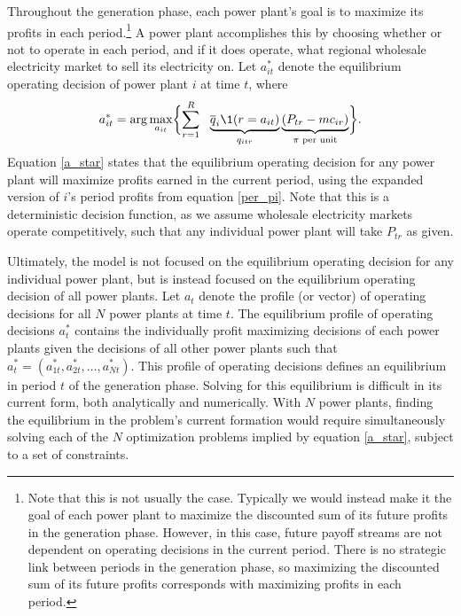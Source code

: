 Throughout the generation phase, each power plant's goal is to maximize its profits in each period.\footnote{Note that this is not usually the case. Typically we would instead make it the goal of each power plant to maximize the discounted sum of its future profits in the generation phase. However, in this case, future payoff streams are not dependent on operating decisions in the current period. There is no strategic link between periods in the generation phase, so maximizing the discounted sum of its future profits corresponds with maximizing profits in each period.} A power plant accomplishes this by choosing whether or not to operate in each period, and if it does operate, what regional wholesale electricity market to sell its electricity on. Let $a_{it}^*$ denote the equilibrium operating decision of power plant $i$ at time $t$, where
\begin{equation}\label{a_star}
    a_{it}^* = \arg\max_{a_{it}} \biggl\{ \sum_{r=1}^R ~~\underbrace{\overline{q}_i \1(r = a_{it})}_{q_{itr}} \underbrace{(P_{tr} - mc_{ir})}_\text{$\pi$ per unit} \biggr\}.
\end{equation}
Equation \eqref{a_star} states that the equilibrium operating decision for any power plant will maximize profits earned in the current period, using the expanded version of $i$'s period profits from equation \eqref{per_pi}. Note that this is a deterministic decision function, as we assume wholesale electricity markets operate competitively, such that any individual power plant will take $P_{tr}$ as given. 

Ultimately, the model is not focused on the equilibrium operating decision for any individual power plant, but is instead focused on the equilibrium operating decision of all power plants. Let $a_t$ denote the profile (or vector) of operating decisions for all $N$ power plants at time $t$. The equilibrium profile of operating decisions $a_t^*$ contains the individually profit maximizing decisions of each power plants given the decisions of all other power plants such that $a_t^* = (a_{1t}^*, a_{2t}^*, \ldots, a_{Nt}^*)$. This profile of operating decisions defines an equilibrium in period $t$ of the generation phase. Solving for this equilibrium is difficult in its current form, both analytically and numerically. With $N$ power plants, finding the equilibrium in the problem's current formation would require simultaneously solving each of the $N$ optimization problems implied by equation \eqref{a_star}, subject to a set of constraints. 

